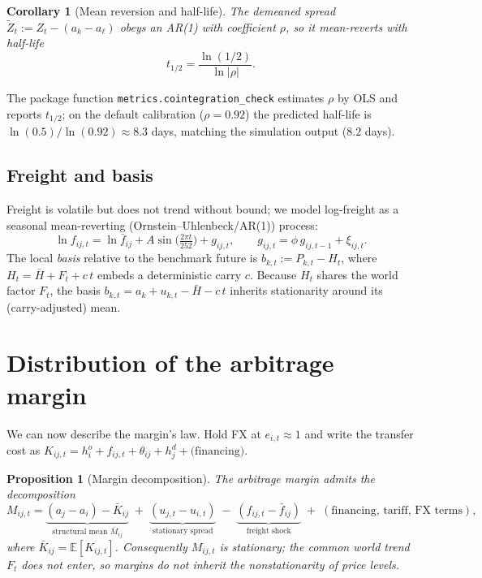 \documentclass[11pt]{article}
\theoremstyle{definition}
\theoremstyle{plain}
\newtheorem{proposition}{Proposition}
\newtheorem{corollary}{Corollary}
\newcommand{\E}{\mathbb{E}}
\begin{document}
\begin{corollary}[Mean reversion and half-life]
The demeaned spread $\tilde Z_t:=Z_t-(a_k-a_\ell)$ obeys an AR(1) with
coefficient $\rho$, so it mean-reverts with half-life
\begin{equation}
t_{1/2}=\frac{\ln(1/2)}{\ln|\rho|}.
\end{equation}
\end{corollary}

\noindent
The package function \texttt{metrics.cointegration\_check} estimates $\rho$ by
OLS and reports $t_{1/2}$; on the default calibration ($\rho=0.92$) the
predicted half-life is $\ln(0.5)/\ln(0.92)\approx 8.3$ days, matching the
simulation output ($8.2$ days).

\subsection{Freight and basis}

Freight is volatile but does not trend without bound; we model log-freight as a
seasonal mean-reverting (Ornstein--Uhlenbeck/AR(1)) process:
\begin{equation}
\ln f_{ij,t}=\ln \bar f_{ij}+A\sin\!\Big(\tfrac{2\pi t}{252}\Big)+g_{ij,t},
\qquad g_{ij,t}=\phi\,g_{ij,t-1}+\xi_{ij,t}.
\end{equation}
The local \emph{basis} relative to the benchmark future is
$b_{k,t}:=P_{k,t}-H_t$, where $H_t=\bar H+F_t+c\,t$ embeds a deterministic carry
$c$. Because $H_t$ shares the world factor $F_t$, the basis $b_{k,t}=a_k+u_{k,t}
-\bar H-c\,t$ inherits stationarity around its (carry-adjusted) mean.

\section{Distribution of the arbitrage margin}
\label{sec:dist}

We can now describe the margin's law. Hold FX at $e_{i,t}\approx 1$ and write
the transfer cost as
$K_{ij,t}=h^o_i+f_{ij,t}+\theta_{ij}+h^d_j+\text{(financing)}$.

\begin{proposition}[Margin decomposition]
\label{prop:margindist}
The arbitrage margin admits the decomposition
\begin{equation}
M_{ij,t}=\underbrace{(a_j-a_i)-\bar K_{ij}}_{\text{structural mean }\bar M_{ij}}
\;+\;\underbrace{(u_{j,t}-u_{i,t})}_{\text{stationary spread}}
\;-\;\underbrace{(f_{ij,t}-\bar f_{ij})}_{\text{freight shock}}
\;+\;(\text{financing, tariff, FX terms}),
\end{equation}
where $\bar K_{ij}=\E[K_{ij,t}]$. Consequently $M_{ij,t}$ is stationary; the
common world trend $F_t$ does \emph{not} enter, so margins do not inherit the
nonstationarity of price levels.
\end{proposition}
\end{document}
